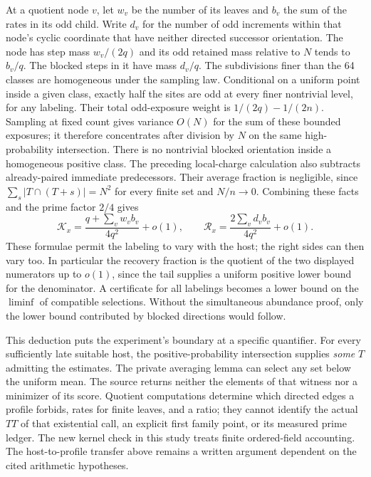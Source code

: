 At a quotient node \(v\), let \(w_v\) be the number of its leaves and \(b_v\) the sum of the rates in its odd child. Write \(d_v\) for the number of odd increments within that node's cyclic coordinate that have neither directed successor orientation. The node has step mass \(w_v/(2q)\) and its odd retained mass relative to \(N\) tends to \(b_v/q\). The blocked steps in it have mass \(d_v/q\). The subdivisions finer than the 64 classes are homogeneous under the sampling law. Conditional on a uniform point inside a given class, exactly half the sites are odd at every finer nontrivial level, for any labeling. Their total odd-exposure weight is \(1/(2q)-1/(2n)\). Sampling at fixed count gives variance \(O(N)\) for the sum of these bounded exposures; it therefore concentrates after division by \(N\) on the same high-probability intersection. There is no nontrivial blocked orientation inside a homogeneous positive class. The preceding local-charge calculation also subtracts already-paired immediate predecessors. Their average fraction is negligible, since \(\sum_s|T\cap(T+s)|=N^2\) for every finite set and \(N/n\to0\). Combining these facts and the prime factor \(2/4\) gives
\[
 \mathcal K_x=\frac{q+\sum_v w_v b_v}{4q^2}+o(1),
 \qquad
 \mathcal R_x=\frac{2\sum_v d_v b_v}{4q^2}+o(1).
\]
These formulae permit the labeling to vary with the host; the right sides can then vary too. In particular the recovery fraction is the quotient of the two displayed numerators up to \(o(1)\), since the tail supplies a uniform positive lower bound for the denominator. A certificate for all labelings becomes a lower bound on the \(\liminf\) of compatible selections. Without the simultaneous abundance proof, only the lower bound contributed by blocked directions would follow.

This deduction puts the experiment's boundary at a specific quantifier. For every sufficiently late suitable host, the positive-probability intersection supplies \emph{some} \(T\) admitting the estimates. The private averaging lemma can select any set below the uniform mean. The source returns neither the elements of that witness nor a minimizer of its score. Quotient computations determine which directed edges a profile forbids, rates for finite leaves, and a ratio; they cannot identify the actual \(TT\) of that existential call, an explicit first family point, or its measured prime ledger. The new kernel check in this study treats finite ordered-field accounting. The host-to-profile transfer above remains a written argument dependent on the cited arithmetic hypotheses.
